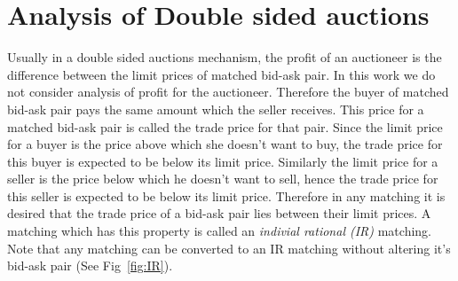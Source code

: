 \documentclass[a4paper,UKenglish,cleveref, autoref]{lipics-v2019}
\begin{document}
\begin{lemma}
\end{lemma}

\begin{lemma}
\end{lemma}

\section{Analysis of Double sided auctions}\label{sec:analysis}
Usually in a double sided auctions mechanism, the profit of an auctioneer is the difference between the limit prices of matched bid-ask pair. In this work we do not consider analysis of profit for the auctioneer. Therefore the buyer of matched bid-ask pair pays the same amount which the seller receives. This price for a matched  bid-ask pair is called the trade price for that pair. Since the limit price for a buyer is the price above which she doesn't want to buy, the trade price for this buyer is expected to be below its limit price. Similarly the limit price for a seller is the price below which he doesn't want to sell, hence the trade price for this seller is expected to be below its limit price. Therefore in any matching it is desired that the trade price of a bid-ask pair lies between their limit prices. A matching which has this property is called an \emph{indivial rational (IR)} matching. Note that any matching can be converted to an IR matching without altering it's bid-ask pair (See Fig~\ref{fig:IR}).
\end{document}
